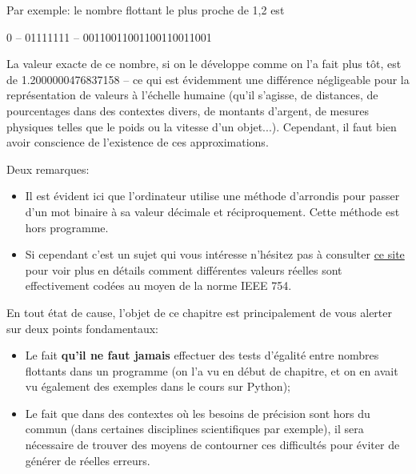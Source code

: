 \documentclass[12pt]{article}
\begin{document}
	Par exemple: le nombre flottant le plus proche de 1,2 est
	\begin{center}
		0 -- 01111111 -- 00110011001100110011001
	\end{center}
	La valeur exacte de ce nombre, si on le développe comme on l'a fait plus tôt, est de 1.2000000476837158 -- ce qui est évidemment une différence négligeable pour la représentation de valeurs à l'échelle humaine (qu'il s'agisse, de distances, de pourcentages dans des contextes divers, de montants d'argent, de mesures physiques telles que le poids ou la vitesse d'un objet...). Cependant, il faut bien avoir conscience de l'existence de ces approximations.
	
	Deux remarques:
	\begin{itemize}
		\item Il est évident ici que l'ordinateur utilise une méthode d'arrondis pour passer d'un mot binaire à sa valeur décimale et réciproquement. Cette méthode est hors programme.
		\item Si cependant c'est un sujet qui vous intéresse n'hésitez pas à consulter  \href{https://www.h-schmidt.net/FloatConverter/IEEE754.html}{ce site} pour voir plus en détails comment différentes valeurs réelles sont effectivement codées au moyen de la norme IEEE 754.
	\end{itemize}
	
	
	En tout état de cause, l'objet de ce chapitre est principalement de vous alerter sur deux points fondamentaux:
	
	\begin{itemize}
		\item Le fait \textbf{qu'il ne faut jamais} effectuer des tests d'égalité entre nombres flottants dans un programme (on l'a vu en début de chapitre, et on en avait vu également des exemples dans le cours sur Python);
		\item Le fait que dans des contextes où les besoins de précision sont hors du commun (dans certaines disciplines scientifiques par exemple), il sera nécessaire de trouver des moyens de contourner ces difficultés pour éviter de générer de réelles erreurs.
	\end{itemize}
	
\end{document}
